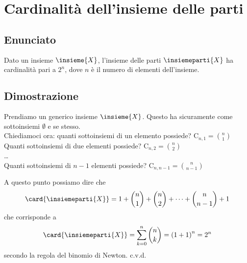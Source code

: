 \documentclass[../../dimostrazioni]{subfiles}
\begin{document}
    \chapter{Cardinalità dell'insieme delle parti}

        \section*{Enunciato}

            Dato un insieme \(\insieme{X}\), l'insieme delle parti \(\insiemeparti{X}\) ha cardinalità pari a \(2^n\), dove \(n\) è il numero di elementi dell'insieme.

        \section*{Dimostrazione}

            Prendiamo un generico insieme \(\insieme{X}\). Questo ha sicuramente come sottoinsiemi \(\emptyset\) e se stesso.\\
            Chiediamoci ora: quanti sottoinsiemi di un elemento possiede? \(\mathrm{C}_{n, 1} = \binom{n}{1}\)\\
            Quanti sottoinsiemi di due elementi possiede? \(\mathrm{C}_{n, 2} = \binom{n}{2}\)\\
            \dots\\
            Quanti sottoinsiemi di \(n - 1\) elementi possiede? \(\mathrm{C}_{n, n - 1} = \binom{n}{n - 1}\)

            A questo punto possiamo dire che
            \[
                \card{\insiemeparti{X}} = 1 + \binom{n}{1} + \binom{n}{2} + \dots + \binom{n}{n - 1} + 1
            \]
            che corrisponde a
            \[
                \card{\insiemeparti{X}} = \sum_{k = 0}^n \binom{n}{k} = {(1 + 1)}^n = 2^n
            \]
            secondo la regola del binomio di Newton. c.v.d.
    
\end{document}
